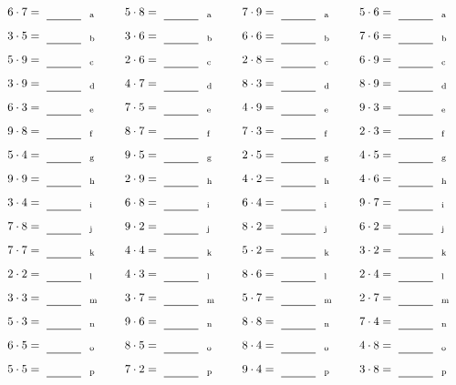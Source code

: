 \documentclass
[
  draft    = true,
  fontsize = 11pt,
  parskip  = half-
]
{scrartcl}
\begin{document}
\par\vfill\par
\begin{align*}
    \pline{6\cdot7}&=\rline{a}
  & \pline{5\cdot8}&=\rline{a}
  & \pline{7\cdot9}&=\rline{a}
  & \pline{5\cdot6}&=\rline{a} \\[1ex]
    \pline{3\cdot5}&=\rline{b}
  & \pline{3\cdot6}&=\rline{b}
  & \pline{6\cdot6}&=\rline{b}
  & \pline{7\cdot6}&=\rline{b} \\[1ex]
    \pline{5\cdot9}&=\rline{c}
  & \pline{2\cdot6}&=\rline{c}
  & \pline{2\cdot8}&=\rline{c}
  & \pline{6\cdot9}&=\rline{c} \\[1ex]
    \pline{3\cdot9}&=\rline{d}
  & \pline{4\cdot7}&=\rline{d}
  & \pline{8\cdot3}&=\rline{d}
  & \pline{8\cdot9}&=\rline{d} \\[1ex]
    \pline{6\cdot3}&=\rline{e}
  & \pline{7\cdot5}&=\rline{e}
  & \pline{4\cdot9}&=\rline{e}
  & \pline{9\cdot3}&=\rline{e} \\[1ex]
    \pline{9\cdot8}&=\rline{f}
  & \pline{8\cdot7}&=\rline{f}
  & \pline{7\cdot3}&=\rline{f}
  & \pline{2\cdot3}&=\rline{f} \\[1ex]
    \pline{5\cdot4}&=\rline{g}
  & \pline{9\cdot5}&=\rline{g}
  & \pline{2\cdot5}&=\rline{g}
  & \pline{4\cdot5}&=\rline{g} \\[1ex]
    \pline{9\cdot9}&=\rline{h}
  & \pline{2\cdot9}&=\rline{h}
  & \pline{4\cdot2}&=\rline{h}
  & \pline{4\cdot6}&=\rline{h} \\[1ex]
    \pline{3\cdot4}&=\rline{i}
  & \pline{6\cdot8}&=\rline{i}
  & \pline{6\cdot4}&=\rline{i}
  & \pline{9\cdot7}&=\rline{i} \\[1ex]
    \pline{7\cdot8}&=\rline{j}
  & \pline{9\cdot2}&=\rline{j}
  & \pline{8\cdot2}&=\rline{j}
  & \pline{6\cdot2}&=\rline{j} \\[1ex]
    \pline{7\cdot7}&=\rline{k}
  & \pline{4\cdot4}&=\rline{k}
  & \pline{5\cdot2}&=\rline{k}
  & \pline{3\cdot2}&=\rline{k} \\[1ex]
    \pline{2\cdot2}&=\rline{l}
  & \pline{4\cdot3}&=\rline{l}
  & \pline{8\cdot6}&=\rline{l}
  & \pline{2\cdot4}&=\rline{l} \\[1ex]
    \pline{3\cdot3}&=\rline{m}
  & \pline{3\cdot7}&=\rline{m}
  & \pline{5\cdot7}&=\rline{m}
  & \pline{2\cdot7}&=\rline{m} \\[1ex]
    \pline{5\cdot3}&=\rline{n}
  & \pline{9\cdot6}&=\rline{n}
  & \pline{8\cdot8}&=\rline{n}
  & \pline{7\cdot4}&=\rline{n} \\[1ex]
    \pline{6\cdot5}&=\rline{o}
  & \pline{8\cdot5}&=\rline{o}
  & \pline{8\cdot4}&=\rline{o}
  & \pline{4\cdot8}&=\rline{o} \\[1ex]
    \pline{5\cdot5}&=\rline{p}
  & \pline{7\cdot2}&=\rline{p}
  & \pline{9\cdot4}&=\rline{p}
  & \pline{3\cdot8}&=\rline{p}
\end{align*}
\end{document}
